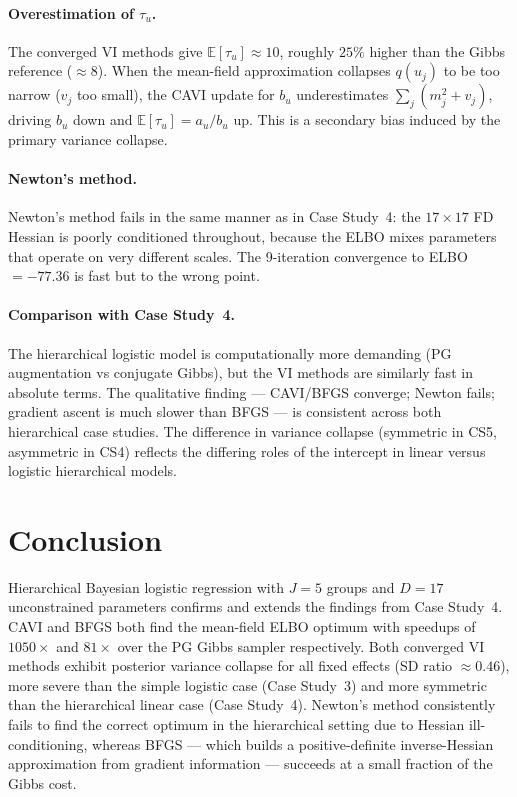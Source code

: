 \documentclass[11pt,a4paper]{article}
\newcommand{\E}{\mathbb{E}}
\begin{document}
\paragraph{Overestimation of $\tau_u$.}
The converged VI methods give $\E[\tau_u] \approx 10$, roughly $25\%$ higher than the
Gibbs reference ($\approx 8$).
When the mean-field approximation collapses $q(u_j)$ to be too narrow
($v_j$ too small), the CAVI update for $b_u$ underestimates
$\sum_j(m_j^2 + v_j)$, driving $b_u$ down and $\E[\tau_u] = a_u/b_u$ up.
This is a secondary bias induced by the primary variance collapse.

\paragraph{Newton's method.}
Newton's method fails in the same manner as in Case Study~4: the $17\times17$
FD Hessian is poorly conditioned throughout, because the ELBO mixes parameters that
operate on very different scales.
The 9-iteration convergence to ELBO $= -77.36$ is fast but to the wrong point.

\paragraph{Comparison with Case Study~4.}
The hierarchical logistic model is computationally more demanding (PG augmentation
vs conjugate Gibbs), but the VI methods are similarly fast in absolute terms.
The qualitative finding --- CAVI/BFGS converge; Newton fails; gradient ascent is
much slower than BFGS --- is consistent across both hierarchical case studies.
The difference in variance collapse (symmetric in CS5, asymmetric in CS4) reflects the
differing roles of the intercept in linear versus logistic hierarchical models.

\section{Conclusion}

Hierarchical Bayesian logistic regression with $J=5$ groups and $D=17$ unconstrained
parameters confirms and extends the findings from Case Study~4.
CAVI and BFGS both find the mean-field ELBO optimum with speedups of
$1050\times$ and $81\times$ over the PG Gibbs sampler respectively.
Both converged VI methods exhibit posterior variance collapse for all fixed effects
(SD ratio $\approx 0.46$), more severe than the simple logistic case (Case Study~3)
and more symmetric than the hierarchical linear case (Case Study~4).
Newton's method consistently fails to find the correct optimum in the hierarchical
setting due to Hessian ill-conditioning, whereas BFGS --- which builds a positive-definite
inverse-Hessian approximation from gradient information --- succeeds at a small fraction
of the Gibbs cost.

\printbibliography
\end{document}
